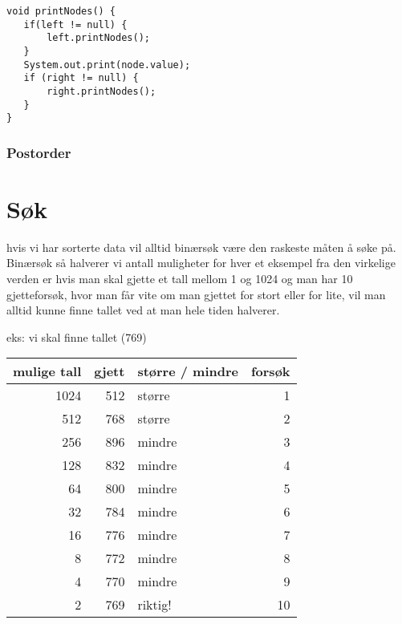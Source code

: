 \documentclass[11pt]{article}
\begin{document}
\begin{verbatim}
void printNodes() {
   if(left != null) {
       left.printNodes();
   }
   System.out.print(node.value);
   if (right != null) {
       right.printNodes();
   }
}
\end{verbatim}
\subsubsection{Postorder}
\label{sec-10-2-3}
\section{Søk}
\label{sec-11}

  hvis vi har sorterte data vil alltid binærsøk være den raskeste måten
  å søke på. Binærsøk så halverer vi antall muligheter for hver et eksempel
  fra den virkelige verden er hvis man skal gjette et tall mellom 1 og 1024
  og man har 10 gjetteforsøk, hvor man får vite om man gjettet for stort eller
  for lite, vil man alltid kunne finne tallet ved at man hele tiden halverer.

  eks: vi skal finne tallet (769)

\begin{center}
\begin{tabular}{rrlr}
\hline
 mulige tall  &  gjett  &  større / mindre  &  forsøk  \\
\hline
        1024  &    512  &  større           &       1  \\
\hline
         512  &    768  &  større           &       2  \\
\hline
         256  &    896  &  mindre           &       3  \\
\hline
         128  &    832  &  mindre           &       4  \\
\hline
          64  &    800  &  mindre           &       5  \\
\hline
          32  &    784  &  mindre           &       6  \\
\hline
          16  &    776  &  mindre           &       7  \\
\hline
           8  &    772  &  mindre           &       8  \\
\hline
           4  &    770  &  mindre           &       9  \\
\hline
           2  &    769  &  riktig!          &      10  \\
\hline
\end{tabular}
\end{center}
\end{document}
